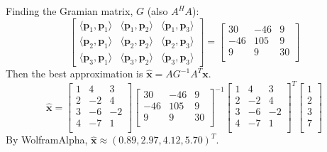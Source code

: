 \documentclass[11pt]{article}
\newcommand\inner[2]{\langle #1, #2 \rangle}
\begin{document}
\begin{homeworkProblem}
    Finding the Gramian matrix, $G$ (also $A^H A$):
    \[
        \begin{bmatrix}
            \inner{\mathbf{p}_1}{\mathbf{p}_1} & \inner{\mathbf{p}_1}{\mathbf{p}_2} & \inner{\mathbf{p}_1}{\mathbf{p}_3} \\
            \inner{\mathbf{p}_2}{\mathbf{p}_1} & \inner{\mathbf{p}_2}{\mathbf{p}_2} & \inner{\mathbf{p}_2}{\mathbf{p}_3} \\
            \inner{\mathbf{p}_3}{\mathbf{p}_1} & \inner{\mathbf{p}_3}{\mathbf{p}_2} & \inner{\mathbf{p}_3}{\mathbf{p}_3}
        \end{bmatrix} =
        \begin{bmatrix}
            30  & -46 & 9  \\
            -46 & 105 & 9  \\
            9   & 9   & 30 \\
        \end{bmatrix}
    \]
    Then the best approximation is $\hat{\mathbf{x}} = AG^{-1}A^T \mathbf{x}$.
    \[
        \hat{\mathbf{x}} =
        \begin{bmatrix}
            1 & 4  & 3  \\
            2 & -2 & 4  \\
            3 & -6 & -2 \\
            4 & -7 & 1  \\
        \end{bmatrix}
        \begin{bmatrix}
            30  & -46 & 9  \\
            -46 & 105 & 9  \\
            9   & 9   & 30 \\
        \end{bmatrix}^{-1}
        \begin{bmatrix}
            1 & 4  & 3  \\
            2 & -2 & 4  \\
            3 & -6 & -2 \\
            4 & -7 & 1  \\
        \end{bmatrix}^T
        \begin{bmatrix}
            1 \\
            2 \\
            3 \\
            7 \\
        \end{bmatrix}
    \]
    By WolframAlpha, $\hat{\mathbf{x}} \approx (0.89, 2.97, 4.12, 5.70)^T$.


\end{homeworkProblem}
\end{document}
